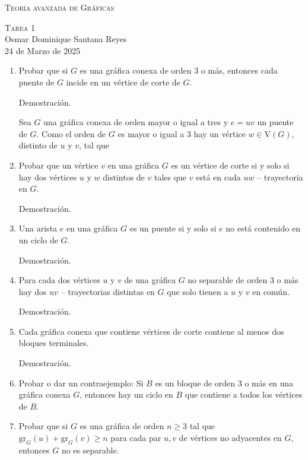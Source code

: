 \documentclass[12pt, fleqn]{article}
\newcommand{\V}[1]{\mathrm{V} \! \left( #1 \right)}
\newcommand{\tray}[2]{$ #1 #2 $ -- trayectoria}
\newcommand{\grado}[2]{\mathrm{gr}_{#2} \left( #1 \right)}
\begin{document}
	\begin{center}
		{\huge \textsc{Teoría avanzada de Gráficas}}

		{\Large \textsc{Tarea 1}} \\
		Osmar Dominique Santana Reyes \\
		24 de Marzo de 2025
	\end{center} \vspace{3mm}

	\begin{enumerate}
		\item Probar que si $ G $ es una gráfica conexa de orden 3 o más, entonces cada puente de $ G $ incide en un vértice de corte de $ G $.
		
		Demostración.

		Sea $ G $ una gráfica conexa de orden mayor o igual a tres y $ e = uv $ un puente de $ G $. Como el orden de $ G $ es mayor o igual a 3 hay un vértice $ w \in \V{G} $, distinto de $ u $ y $ v $, tal que  

		\item Probar que un vértice $ v $ en una gráfica $ G $ es un vértice de corte si y solo si hay dos vértices $ u $ y $ w $ distintos de $ v $ tales que $ v $ está en cada \tray{u}{w} en $ G $.
		
		Demostración.



		\item Una arista $ e $ en una gráfica $ G $ es un puente si y solo si $ e $ no está contenido en un ciclo de $ G $.
		
		Demostración.



		\item Para cada dos vértices $ u $ y $ v $ de una gráfica $ G $ no separable de orden 3 o más hay dos \tray{u}{v}s distintas en $ G $ que solo tienen a $ u $ y $ v $ en común.
		
		Demostración.



		\item Cada gráfica conexa que contiene vértices de corte contiene al menos dos bloques terminales.
		
		Demostración.



		\item Probar o dar un contraejemplo: Si $ B $ es un bloque de orden 3 o más en una gráfica conexa $ G $, entonces hay un ciclo en $ B $ que contiene a todos los vértices de $ B $.
		\item Probar que si $ G $ es una gráfica de orden $ n \geq 3 $ tal que $ \grado{u}{G} + \grado{v}{G} \geq n $ para cada par $ u, v $ de vértices no adyacentes en $ G $, entonces $ G $ no es separable.
		

\end{enumerate}
\end{document}
